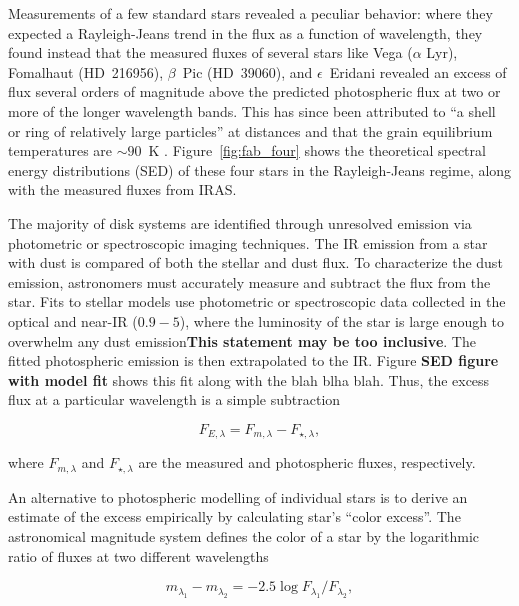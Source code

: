     
    
    Measurements of a few standard stars revealed a peculiar behavior: where they expected a Rayleigh-Jeans trend in the flux as a function of wavelength, they found instead that the measured fluxes of several stars like Vega ($\alpha$ Lyr), Fomalhaut (HD~216956), $\beta$~Pic (HD~39060), and $\epsilon$~Eridani revealed an excess of flux several orders of magnitude above the predicted photospheric flux at two or more of the longer wavelength bands. This has since been attributed to ``a shell or ring of relatively large particles'' at distances and that the grain equilibrium temperatures are $\sim90$~K \citep{Aumann1984, Backman1993}. Figure~\ref{fig:fab_four} shows the theoretical spectral energy distributions (SED) of these four stars in the Rayleigh-Jeans regime, along with the measured fluxes from IRAS.
    

    The majority of disk systems are identified through unresolved emission via photometric or spectroscopic imaging techniques. The IR emission from a star with dust is compared of both the stellar and dust flux. To characterize the dust emission, astronomers must accurately measure and subtract the flux from the star. Fits to stellar models use photometric or spectroscopic data collected in the optical and near-IR ($0.9-5$\micron), where the luminosity of the star is large enough to overwhelm any dust emission\textbf{This statement may be too inclusive}. The fitted photospheric emission is then extrapolated to the IR. Figure \textbf{SED figure with model fit} shows this fit along with the blah blha blah. Thus, the excess flux at a particular wavelength is a simple subtraction
    
    \begin{equation}\label{eq:excess+flux}
    F_{E,\lambda} = F_{m,\lambda} - F_{\star,\lambda},
    \end{equation}
    
    \noindent where $F_{m,\lambda}$ and $F_{\star,\lambda}$ are the measured and photospheric fluxes, respectively. 
    
    An alternative to photospheric modelling of individual stars is to derive an estimate of the excess empirically by calculating star's ``color excess''. The astronomical magnitude system defines the color of a star by the logarithmic ratio of fluxes at two different wavelengths
    
    \begin{equation}\label{eq:color}
    m_{\lambda_1} - m_{\lambda_2} = -2.5\log{F_{\lambda_1}/F_{\lambda_2}},
    \end{equation}
    
